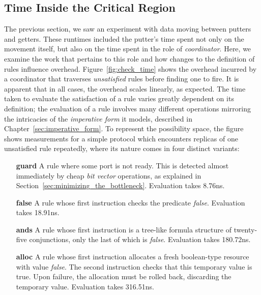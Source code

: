 \subsection{Time Inside the Critical Region}
The previous section, we saw an experiment with data moving between putters and getters. These runtimes included the putter's time spent not only on the movement itself, but also on the time spent in the role of \textit{coordinator}. Here, we examine the work that pertains to this role and how changes to the definition of rules influence overhead. Figure~\ref{fig:check_time} shows the overhead incurred by a coordinator that traverses \textit{unsatisfied} rules before finding one to fire. It is apparent that in all cases, the overhead scales linearly, as expected. The time taken to evaluate the satisfaction of a rule varies greatly dependent on its definition; the evaluation of a rule involves many different operations mirroring the intricacies of the \textit{imperative form} it models, described in Chapter~\ref{sec:imperative_form}. To represent the possibility space, the figure shows measurements for a simple protocol which encounters replicas of one unsatisfied rule repeatedly, where its nature comes in four distinct variants:
\begin{enumerate}
	\item [\textbf{guard}] A rule where some port is not ready. This is detected almost immediately by cheap \textit{bit vector} operations, as explained in Section~\ref{sec:minimizing_the_bottleneck}. Evaluation takes 8.76ns.
	
	\item [\textbf{false}] A rule whose first instruction checks the predicate \textit{false}. Evaluation takes 18.91ns.
	\item [\textbf{ands}] A rule whose first instruction is a tree-like formula structure of twenty-five conjunctions, only the last of which is \textit{false}. Evaluation takes 180.72ns.
	\item [\textbf{alloc}] A rule whose first instruction allocates a fresh boolean-type resource with value \textit{false}. The second instruction checks that this temporary value is true. Upon failure, the allocation must be rolled back, discarding the temporary value. Evaluation takes 316.51ns.
\end{enumerate}



